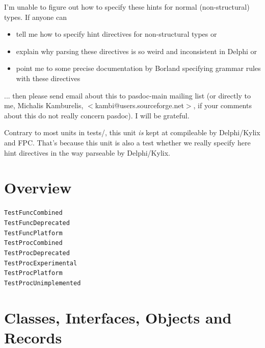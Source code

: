 \documentclass{report}
\begin{document}
I'm unable to figure out how to specify these hints for normal (non{-}structural) types. If anyone can \begin{itemize}
\item tell me how to specify hint directives for non{-}structural types or
\item explain why parsing these directives is so weird and inconsistent in Delphi or
\item point me to some precise documentation by Borland specifying grammar rules with these directives
\end{itemize} ... then please send email about this to pasdoc{-}main mailing list (or directly to me, Michalis Kamburelis, {$<$}kambi@users.sourceforge.net{$>$}, if your comments about this do not really concern pasdoc). I will be grateful.

Contrary to most units in tests/, this unit \textit{is} kept at compileable by Delphi/Kylix and FPC. That's because this unit is also a test whether we really specify here hint directives in the way parseable by Delphi/Kylix.
\section{Overview}
\begin{description}
\item[\texttt{\begin{ttfamily}TTestClassDeprecated\end{ttfamily} Class}]
\item[\texttt{\begin{ttfamily}TTestRecordDeprecated\end{ttfamily} Record}]
\end{description}
\begin{description}
\item[\texttt{TestFuncCombined}]
\item[\texttt{TestFuncDeprecated}]
\item[\texttt{TestFuncPlatform}]
\item[\texttt{TestProcCombined}]
\item[\texttt{TestProcDeprecated}]
\item[\texttt{TestProcExperimental}]
\item[\texttt{TestProcPlatform}]
\item[\texttt{TestProcUnimplemented}]
\end{description}
\section{Classes, Interfaces, Objects and Records}
\end{document}
